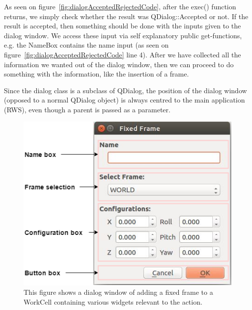 As seen on figure~\ref{fig:dialogAcceptedRejectedCode}, after the exec() function returns, we simply check whether the result was QDialog::Accepted or not. If the result is accepted, then something should be done with the inputs given to the dialog window. We access these input via self explanatory public get-functions, e.g. the NameBox contains the name input (as seen on figure~\ref{fig:dialogAcceptedRejectedCode} line 4). After we have collected all the information we wanted out of the dialog window, then we can proceed to do something with the information, like the insertion of a frame. 


Since the dialog class is a subclass of QDialog, the position of the dialog window (opposed to a normal QDialog object) is always centred to the main application (RWS), even though a parent is passed as a parameter.

\begin{figure}[h]
	\centering
	\includegraphics[scale=0.55]{Figures/dialogclassblocks.png}
	\caption{This figure shows a dialog window of adding a fixed frame to a WorkCell containing various widgets relevant to the action. }
	\label{fig:dialogclassblocks}
\end{figure}

